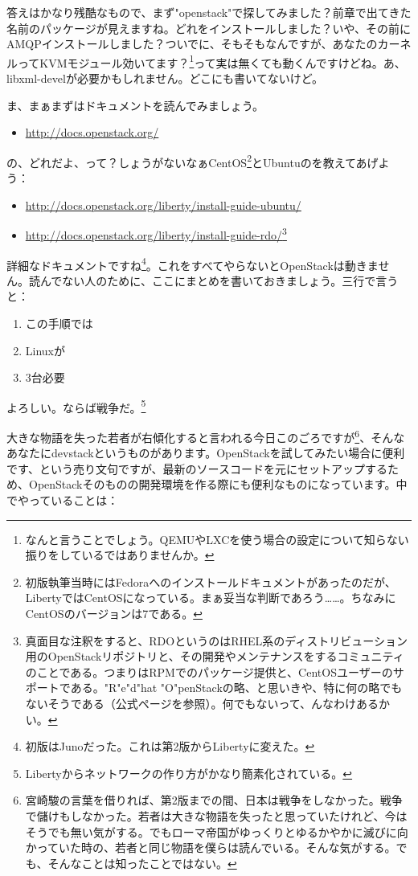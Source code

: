 \documentclass[8pt,b5paper,tombo,openany]{jsbook}
\begin{document}
答えはかなり残酷なもので、まず"openstack"で探してみました？前章で出てきた名前のパッケージが見えますね。どれをインストールしました？いや、その前にAMQPインストールしました？ついでに、そもそもなんですが、あなたのカーネルってKVMモジュール効いてます？\footnote{なんと言うことでしょう。QEMUやLXCを使う場合の設定について知らない振りをしているではありませんか。}って実は無くても動くんですけどね。あ、libxml-develが必要かもしれません。どこにも書いてないけど。

ま、まぁまずはドキュメントを読んでみましょう。

\begin{itemize}
  \item \url{http://docs.openstack.org/}
\end{itemize}

の、どれだよ、って？しょうがないなぁCentOS\footnote{初版執筆当時にはFedoraへのインストールドキュメントがあったのだが、LibertyではCentOSになっている。まぁ妥当な判断であろう……。ちなみにCentOSのバージョンは7である。}とUbuntuのを教えてあげよう：

\begin{itemize}
  \item \url{http://docs.openstack.org/liberty/install-guide-ubuntu/}
  \item \url{http://docs.openstack.org/liberty/install-guide-rdo/}\footnote{真面目な注釈をすると、RDOというのはRHEL系のディストリビューション用のOpenStackリポジトリと、その開発やメンテナンスをするコミュニティのことである。つまりはRPMでのパッケージ提供と、CentOSユーザーのサポートである。"R"e"d"hat "O"penStackの略、と思いきや、特に何の略でもないそうである（公式ページを参照）。何でもないって、んなわけあるかい。}
\end{itemize}

詳細なドキュメントですね\footnote{初版はJunoだった。これは第2版からLibertyに変えた。}。これをすべてやらないとOpenStackは動きません。読んでない人のために、ここにまとめを書いておきましょう。三行で言うと：

\begin{enumerate}
  \item この手順では
  \item Linuxが
  \item 3台必要
\end{enumerate}

よろしい。ならば戦争だ。\footnote{Libertyからネットワークの作り方がかなり簡素化されている。}

大きな物語を失った若者が右傾化すると言われる今日このごろですが\footnote{宮崎駿の言葉を借りれば、第2版までの間、日本は戦争をしなかった。戦争で儲けもしなかった。若者は大きな物語を失ったと思っていたけれど、今はそうでも無い気がする。でもローマ帝国がゆっくりとゆるかやかに滅びに向かっていた時の、若者と同じ物語を僕らは読んでいる。そんな気がする。でも、そんなことは知ったことではない。}、そんなあなたにdevstackというものがあります。OpenStackを試してみたい場合に便利です、という売り文句ですが、最新のソースコードを元にセットアップするため、OpenStackそのものの開発環境を作る際にも便利なものになっています。中でやっていることは：
\end{document}
